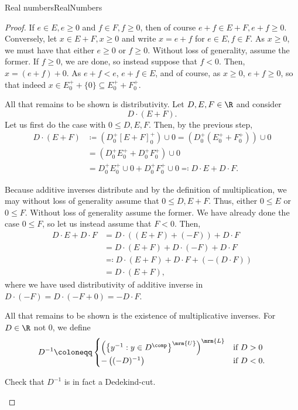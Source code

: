 \begin{thm}{Real numbers}{RealNumbers}
\begin{proof}
If $e\in E,e\geq 0$ and $f\in F,f\geq 0$, then of course $e+f\in E+F,e+f\geq 0$.  Conversely, let $x\in E+F,x\geq 0$ and write $x=e+f$ for $e\in E,f\in F$.  As $x\geq 0$, we must have that either $e\geq 0$ or $f\geq 0$.  Without loss of generality, assume the former.  If $f\geq 0$, we are done, so instead suppose that $f<0$.  Then, $x=(e+f)+0$.  As $e+f<e$, $e+f\in E$, and of course, as $x\geq 0$, $e+f\geq 0$, so that indeed $x\in E_0^++\{ 0\} \subseteq E_0^++F_0^+$.

All that remains to be shown is distributivity.  Let $D,E,F\in \R$ and consider
\begin{equation}
D\cdot (E+F).
\end{equation}
Let us first do the case with $0\leq D,E,F$.  Then, by the previous step,
\begin{equation}
\begin{split}
D\cdot (E+F) & \coloneqq \left( D_0^+[E+F]_0^+\right) \cup 0=\left( D_0^+(E_0^++F_0^+)\right) \cup 0 \\
& =\left( D_0^+E_0^++D_0^+F_0^+\right) \cup 0 \\
& =D_0^+E_0^+\cup 0+D_0^+F_0^+\cup 0\eqqcolon D\cdot E+D\cdot F.
\end{split}
\end{equation}

Because additive inverses distribute and by the definition of multiplication, we may without loss of generality assume that $0\leq D,E+F$.  Thus, either $0\leq E$ or $0\leq F$.  Without loss of generality assume the former.  We have already done the case $0\leq F$, so let us instead assume that $F<0$.  Then,
\begin{equation}
\begin{split}
D\cdot E+D\cdot F & =D\cdot \left( (E+F)+(-F)\right) +D\cdot F \\
& =D\cdot (E+F)+D\cdot (-F)+D\cdot F \\
& \eqqcolon D\cdot (E+F)+D\cdot F+\left( -(D\cdot F)\right) \\
& =D\cdot (E+F),
\end{split}
\end{equation}
where we have used distributivity of additive inverse in $D\cdot (-F)=D\cdot (-F+0)=-D\cdot F$.

All that remains to be shown is the existence of multiplicative inverses.  For $D\in \R$ not $0$, we define
\begin{equation}
D^{-1}\coloneqq \begin{cases}\left( \left\{ y^{-1}:y\in D^{\comp}\right\} ^{\mrm{U}}\right) ^{\mrm{L}}& \text{if }D>0 \\ -\left( (-D)^{-1}\right) & \text{if }D<0.\end{cases}
\end{equation}
\begin{exr}[breakable=false]{}{}
Check that $D^{-1}$ is in fact a Dedekind-cut.
\end{exr}


\end{proof}
\end{thm}
